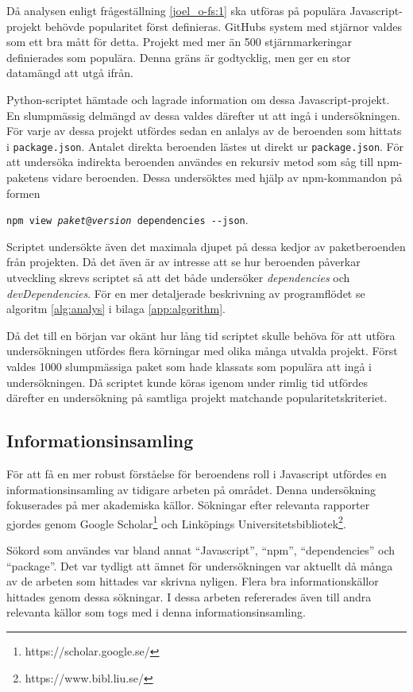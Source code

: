 Då analysen enligt frågeställning \ref{joel_o-fs:1} ska utföras på populära Javascript-projekt behövde popularitet först definieras. GitHubs system med stjärnor valdes som ett bra mått för detta. Projekt med mer än 500 stjärnmarkeringar definierades som populära. Denna gräns är godtycklig, men ger en stor datamängd att utgå ifrån.

Python-scriptet hämtade och lagrade information om dessa Javascript-projekt. En slumpmässig delmängd av dessa valdes därefter ut att ingå i undersökningen. För varje av dessa projekt utfördes sedan en anlalys av de beroenden som hittats i \texttt{package.json}. Antalet direkta beroenden lästes ut direkt ur \texttt{package.json}. För att undersöka indirekta beroenden användes en rekursiv metod som såg till npm-paketens vidare beroenden. Dessa undersöktes med hjälp av npm-kommandon på formen

\begin{center}
  \texttt{npm view \textit{paket}@\textit{version} dependencies \hyphen\hyphen json}.
\end{center}

Scriptet undersökte även det maximala djupet på dessa kedjor av paketberoenden från projekten. Då det även är av intresse att se hur beroenden påverkar utveckling skrevs scriptet så att det både undersöker \textit{dependencies} och \textit{devDependencies}. För en mer detaljerade beskrivning av programflödet se algoritm \ref{alg:analys} i bilaga \ref{app:algorithm}.

Då det till en början var okänt hur lång tid scriptet skulle behöva för att utföra undersökningen utfördes flera körningar med olika många utvalda projekt. Först valdes 1000 slumpmässiga paket som hade klassats som populära att ingå i undersökningen. Då scriptet kunde köras igenom under rimlig tid utfördes därefter en undersökning på samtliga projekt matchande popularitetskriteriet.

\subsection{Informationsinsamling}
För att få en mer robust förståelse för beroendens roll i Javascript utfördes en informationsinsamling av tidigare arbeten på området. Denna undersökning fokuserades på mer akademiska källor. Sökningar efter relevanta rapporter gjordes genom Google Scholar\footnote{https://scholar.google.se/} och Linköpings Universitetsbibliotek\footnote{https://www.bibl.liu.se/}.

Sökord som användes var bland annat ``Javascript'', ``npm'', ``dependencies'' och ``package''. Det var tydligt att ämnet för undersökningen var aktuellt då många av de arbeten som hittades var skrivna nyligen. Flera bra informationskällor hittades genom dessa sökningar. I dessa arbeten refererades även till andra relevanta källor som togs med i denna informationsinsamling.

